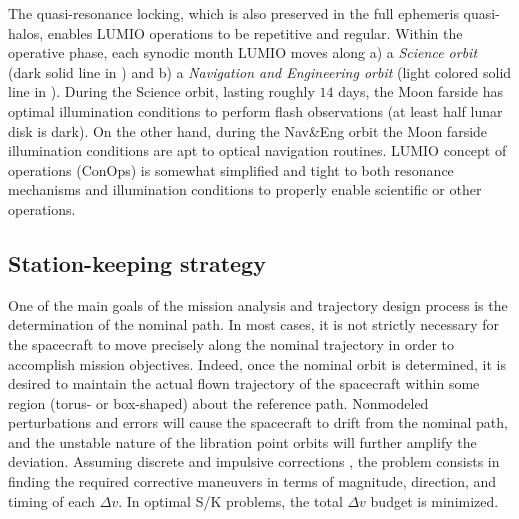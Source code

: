 The quasi-resonance locking, which is also preserved in the full ephemeris quasi-halos, enables LUMIO operations to be repetitive and regular. Within the operative phase, each synodic month LUMIO moves along a) a \emph{Science orbit} (dark solid line in ) and b) a \emph{Navigation and Engineering orbit} (light colored solid line in ). During the Science orbit, lasting roughly $14$ days, the Moon farside has optimal illumination conditions to perform flash observations (\ie at least half lunar disk is dark). On the other hand, during the Nav\&Eng orbit the Moon farside illumination conditions are apt to optical navigation routines. LUMIO concept of operations (ConOps) is somewhat simplified and tight to both resonance mechanisms and illumination conditions to properly enable scientific or other operations.


\subsection{Station-keeping strategy}\label{subsec:S/K strategy}
One of the main goals of the mission analysis and trajectory design process is the determination of the nominal path. In most cases, it is not strictly necessary for the spacecraft to move precisely along the nominal trajectory in order to accomplish mission objectives. Indeed, once the nominal orbit is determined, it is desired to maintain the actual flown trajectory of the spacecraft within some region (\eg torus- or box-shaped) about the reference path. Nonmodeled perturbations and errors will cause the spacecraft to drift from the nominal path, and the unstable nature of the libration point orbits will further amplify the deviation. Assuming discrete and impulsive corrections \cite{mengali2005Biimpulsive}, the  problem consists in finding the required corrective maneuvers in terms of magnitude, direction, and timing of each $\Delta v$. In optimal S/K problems, the total $\Delta v$ budget is minimized.

